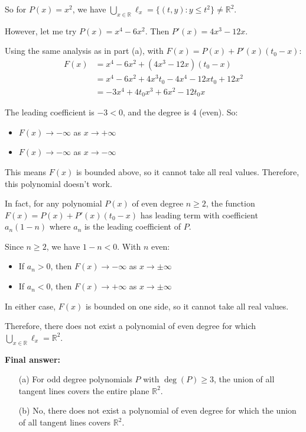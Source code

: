 \documentclass[12pt,a4paper]{article}
\theoremstyle{definition}
\begin{document}
    So for $P(x) = x^2$, we have $\bigcup_{x \in \mathbb{R}} \ell_x = \{(t, y) : y \leq t^2\} \neq \mathbb{R}^2$.

    However, let me try $P(x) = x^4 - 6x^2$. Then $P'(x) = 4x^3 - 12x$.

    Using the same analysis as in part (a), with $F(x) = P(x) + P'(x)(t_0 - x)$:
    \begin{align}
        F(x) &= x^4 - 6x^2 + (4x^3 - 12x)(t_0 - x)\\
        &= x^4 - 6x^2 + 4x^3t_0 - 4x^4 - 12xt_0 + 12x^2\\
        &= -3x^4 + 4t_0x^3 + 6x^2 - 12t_0x
    \end{align}

    The leading coefficient is $-3 < 0$, and the degree is 4 (even). So:
    \begin{itemize}
        \item $F(x) \to -\infty$ as $x \to +\infty$
        \item $F(x) \to -\infty$ as $x \to -\infty$
    \end{itemize}

    This means $F(x)$ is bounded above, so it cannot take all real values. Therefore, this polynomial doesn't work.

    In fact, for any polynomial $P(x)$ of even degree $n \geq 2$, the function $F(x) = P(x) + P'(x)(t_0 - x)$ has leading term with coefficient $a_n(1-n)$ where $a_n$ is the leading coefficient of $P$.

    Since $n \geq 2$, we have $1-n < 0$. With $n$ even:
    \begin{itemize}
        \item If $a_n > 0$, then $F(x) \to -\infty$ as $x \to \pm\infty$
        \item If $a_n < 0$, then $F(x) \to +\infty$ as $x \to \pm\infty$
    \end{itemize}

    In either case, $F(x)$ is bounded on one side, so it cannot take all real values.

    Therefore, there does not exist a polynomial of even degree for which $\bigcup_{x \in \mathbb{R}} \ell_x = \mathbb{R}^2$.

    \textbf{Final answer:}
    \begin{itemize}
        \item[(a)] For odd degree polynomials $P$ with $\deg(P) \geq 3$, the union of all tangent lines covers the entire plane $\mathbb{R}^2$.
        \item[(b)] No, there does not exist a polynomial of even degree for which the union of all tangent lines covers $\mathbb{R}^2$.
    \end{itemize}
\end{document}
